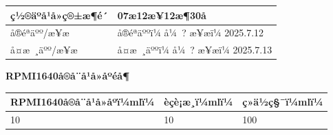 \documentclass[UTF8,10pt,a4paper,fontset=fandol]{ctexart}
\newcommand{\fieldvalue}[1]{#1}
\newcommand{\handwritten}[1]{#1}
\begin{document}
\begin{center}
\begin{center}
\noindent
\begin{tabularx}{\textwidth}{|p{}|X|}
\hline
ç½®äºå¹å»ç®±æ¶é´ &
\fieldvalue{\handwritten{07æ12æ¥12æ¶30å}}\\
\hline
å®éªäºº/æ¥æ &
å®éªäººï¼
\fieldvalue{\handwritten{å¼ ?}} \quad æ¥æï¼
\fieldvalue{\handwritten{2025.7.12}}\\
\hline
å¤æ ¸äºº/æ¥æ &
å¤æ ¸äººï¼
\fieldvalue{\handwritten{å¼ ?}} \quad æ¥æï¼
\fieldvalue{\handwritten{2025.7.13}}\\
\hline
\end{tabularx}

\begin{center}
\textbf{RPMI1640å®å¨å¹å»åºéå¶}
\end{center}

\noindent
\begin{tabularx}{\textwidth}{|X|X|X|}
\hline
RPMI1640å®å¨å¹å»åºï¼mlï¼ & èçè¡æ¸ï¼mlï¼ & ç»ä½ç§¯ï¼mlï¼\\
\hline
\fieldvalue{\handwritten{10}} &
\fieldvalue{\handwritten{10}} &
\fieldvalue{\handwritten{100}}\\
\hline
\end{tabularx}


\end{center}
\end{center}
\end{document}
